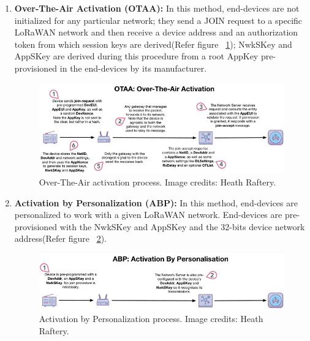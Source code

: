 \begin{enumerate}
	\item \textbf{Over-The-Air Activation (OTAA):} In this method, end-devices are not initialized for any particular network; they send a JOIN request to a specific LoRaWAN network and then receive a device address and an authorization token from which session keys are derived(Refer figure ~\ref{OTAA}); NwkSKey and AppSKey are derived during this procedure from a root AppKey pre-provisioned in the end-devices by its manufacturer. \cite{ArduinoLoRaWAN101:2024} 
	
	\begin{figure}
		\begin{center}
			\includegraphics[width=0.7\linewidth]{Images/LORA/OTAA.png}
			\caption{Over-The-Air activation process. Image credits: Heath Raftery.}
			\label{OTAA} 
		\end{center}
	\end{figure}
	
	\item \textbf{Activation by Personalization (ABP):} In this method, end-devices are personalized to work with a given LoRaWAN network. End-devices are pre-provisioned with the NwkSKey and AppSKey and the 32-bits device network address(Refer figure ~\ref{Activation}). \cite{ArduinoLoRaWAN101:2024}
	
	\begin{figure}
		\begin{center}
			\includegraphics[width=0.7\linewidth]{Images/LORA/Activation.png}
			\caption{Activation by Personalization process. Image credits: Heath Raftery.}
			\label{Activation} 
		\end{center}
	\end{figure}	
	
\end{enumerate}


